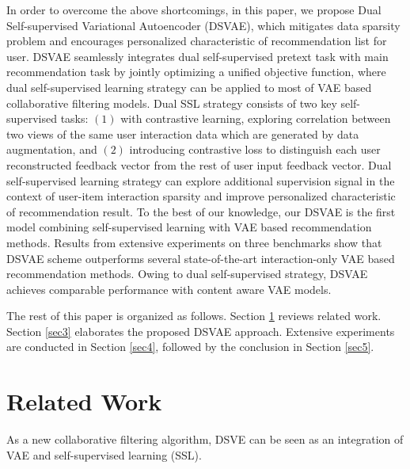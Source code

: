 In order to overcome the above shortcomings, in this paper, we propose Dual Self-supervised Variational Autoencoder (DSVAE), which mitigates data sparsity problem and encourages personalized characteristic of recommendation list for user. DSVAE seamlessly integrates dual self-supervised pretext task with main recommendation task by jointly optimizing a unified objective function, where dual self-supervised learning strategy can be applied to most of VAE based collaborative filtering models. Dual SSL strategy consists of two key self-supervised tasks: $\left(1\right)$ with contrastive learning, exploring correlation between two views of the same user interaction data which are generated by data augmentation,  
and $\left(2\right)$ introducing contrastive loss to distinguish each user reconstructed feedback vector from the rest of user input feedback vector. Dual self-supervised learning strategy can explore additional supervision signal in the context of user-item interaction  sparsity and improve personalized characteristic of recommendation result. To the best of our knowledge, our DSVAE is the first model combining self-supervised learning with VAE based recommendation methods. Results from extensive experiments on three benchmarks show that DSVAE scheme outperforms several state-of-the-art interaction-only VAE based recommendation methods. Owing to dual self-supervised strategy, DSVAE achieves comparable performance with content aware VAE models.


The rest of this paper is organized as follows. Section \ref{sec2} reviews related work. Section \ref{sec3} elaborates the proposed DSVAE approach. Extensive experiments are conducted in Section \ref{sec4}, followed by the conclusion in Section \ref{sec5}. 

\section{Related Work}\label{sec2}
As a new collaborative filtering algorithm, DSVE can be seen as an integration of VAE and self-supervised
learning (SSL).


